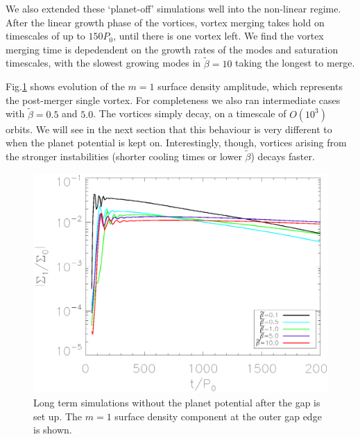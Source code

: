 We also extended these `planet-off' simulations well into the non-linear
regime. After the linear growth phase of the vortices, vortex merging
takes hold on timescales of up to $150P_0$, until there is one vortex
left. We find the vortex merging
time is depedendent on the growth rates of the modes and saturation
timescales, with the slowest growing modes in $\tilde\beta=10$ taking
the longest to merge.  

Fig.\ref{planetofflifetimeplot} shows evolution of the $m=1$ surface
density amplitude, which represents the post-merger single vortex. For
completeness we also ran intermediate cases with $\tilde{\beta}=0.5$
and $5.0$. The vortices simply decay, on a timescale of $O(10^3)$
orbits. We will see in the next section that this behaviour is very
different to when the planet potential is kept on. Interestingly,
though, vortices arising from the stronger instabilities (shorter
cooling times or lower $\tilde{\beta}$) decays faster.  




\begin{figure}
  \includegraphics[width=\linewidth,clip=true,trim=0.5cm
  0cm 0cm 1.1cm]{figures/longterm_planetoff}
  \caption{Long term simulations without the planet potential after
    the gap is set up. The $m=1$ surface density component at the
    outer gap edge is shown.
  } \label{planetofflifetimeplot}
\end{figure}

